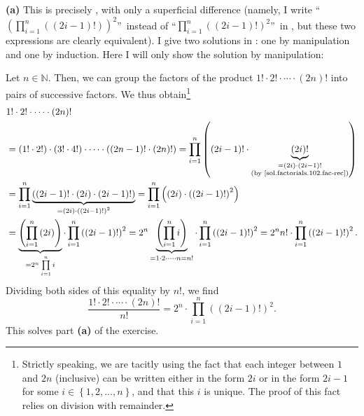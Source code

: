 \documentclass[paper=a4, fontsize=12pt]{scrartcl}%
\let\prodnonlimits\prod
\renewcommand{\prod}{\prodnonlimits\limits}
\theoremstyle{plainsl}
\theoremstyle{definition}
\theoremstyle{remark}
\begin{document}
\vspace{0.809pc}

\textbf{(a)} This is precisely \cite[Exercise 3.5 \textbf{(c)}]{detnotes},
with only a superficial difference (namely, I write \textquotedblleft$\left(
\prod_{i=1}^{n}\left(  \left(  2i-1\right)  !\right)  \right)  ^{2}%
$\textquotedblright\ instead of \textquotedblleft$\prod_{i=1}^{n}\left(
\left(  2i-1\right)  !\right)  ^{2}$\textquotedblright\ in \cite[Exercise 3.5
\textbf{(c)}]{detnotes}, but these two expressions are clearly equivalent). I
give two solutions in \cite[solution to Exercise 3.5 \textbf{(c)}]{detnotes}:
one by manipulation and one by induction. Here I will only show the solution
by manipulation:

Let $n\in\mathbb{N}$. Then, we can group the factors of the product
$1!\cdot2!\cdot\cdots\cdot\left(  2n\right)  !$ into pairs of successive
factors. We thus obtain\footnote{Strictly speaking, we are tacitly using the
fact that each integer between $1$ and $2n$ (inclusive) can be written either
in the form $2i$ or in the form $2i-1$ for some $i\in\left\{  1,2,\ldots
,n\right\}  $, and that this $i$ is unique. The proof of this fact relies on
division with remainder.}%
\begin{align*}
&  1!\cdot2!\cdot\cdots\cdot\left(  2n\right)  !\\
&  =\left(  1!\cdot2!\right)  \cdot\left(  3!\cdot4!\right)  \cdot\cdots
\cdot\left(  \left(  2n-1\right)  !\cdot\left(  2n\right)  !\right)
=\prod_{i=1}^{n}\left(  \left(  2i-1\right)  !\cdot\underbrace{\left(
2i\right)  !}_{\substack{=\left(  2i\right)  \cdot\left(  2i-1\right)
!\\\text{(by \eqref{sol.factorials.102.fac-rec})}}}\right)  \\
&  =\prod_{i=1}^{n}\underbrace{\left(  \left(  2i-1\right)  !\cdot\left(
2i\right)  \cdot\left(  2i-1\right)  !\right)  }_{=\left(  2i\right)
\cdot\left(  \left(  2i-1\right)  !\right)  ^{2}}=\prod_{i=1}^{n}\left(
\left(  2i\right)  \cdot\left(  \left(  2i-1\right)  !\right)  ^{2}\right)  \\
&  =\underbrace{\left(  \prod_{i=1}^{n}\left(  2i\right)  \right)  }%
_{=2^{n}\prod_{i=1}^{n}i}\cdot\prod_{i=1}^{n}\left(  \left(  2i-1\right)
!\right)  ^{2}=2^{n}\underbrace{\left(  \prod_{i=1}^{n}i\right)  }%
_{=1\cdot2\cdot\cdots\cdot n=n!}\cdot\prod_{i=1}^{n}\left(  \left(
2i-1\right)  !\right)  ^{2}=2^{n}n!\cdot\prod_{i=1}^{n}\left(  \left(
2i-1\right)  !\right)  ^{2}.
\end{align*}
Dividing both sides of this equality by $n!$, we find%
\[
\dfrac{1!\cdot2!\cdot\cdots\cdot\left(  2n\right)  !}{n!}=2^{n}\cdot
\prod_{i=1}^{n}\left(  \left(  2i-1\right)  !\right)  ^{2}.
\]
This solves part \textbf{(a)} of the exercise.
\end{document}
